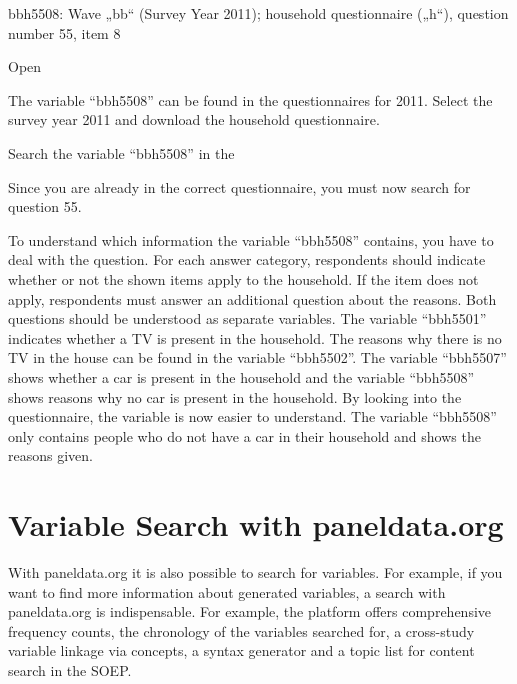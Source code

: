 \documentclass[letterpaper,10pt,openany,onesideH,english]{sphinxmanual}
\begin{document}
bbh5508:  Wave „bb“ (Survey Year 2011); household questionnaire („h“), question number 55, item 8

Open 

The variable “bbh5508” can be found in the questionnaires for 2011. Select the survey year 2011 and download the household questionnaire.

\begin{figure}[H]
\centering

\noindent{}
\end{figure}

Search the variable “bbh5508” in the 

Since you are already in the correct questionnaire, you must now search for question 55.

\begin{figure}[H]
\centering

\noindent{}
\end{figure}

To understand which information the variable “bbh5508” contains, you have to deal with the question. For each answer category, respondents should indicate whether or not the shown items apply to the household. If the item does not apply, respondents must answer an additional question about the reasons. Both questions should be understood as separate variables. The variable “bbh5501” indicates whether a TV is present in the household. The reasons why there is no TV in the house can be found in the variable “bbh5502”. The variable “bbh5507” shows whether a car is present in the household and the variable “bbh5508” shows reasons why no car is present in the household. By looking into the questionnaire, the variable is now easier to understand. The variable “bbh5508” only contains people who do not have a car in their household and shows the reasons given.


\section{Variable Search with paneldata.org}
\label{\detokenize{Working with SOEP Documentation/index:variable-search-with-paneldata-org}}\label{\detokenize{Working with SOEP Documentation/index:var-search}}
With paneldata.org it is also possible to search for variables. For example, if you want to find more information about generated variables, a search with paneldata.org is indispensable. For example, the platform offers comprehensive frequency counts, the chronology of the variables searched for, a cross-study variable linkage via concepts, a syntax generator and a topic list for content search in the SOEP.
\end{document}
